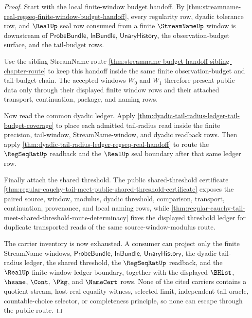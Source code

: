 \begin{proof}
Start with the local finite-window budget handoff. By
\autoref{thm:streamname-real-regseq-finite-window-budget-handoff}, every
regularity row, dyadic tolerance row, and $\RealUp$ seal row consumed from a
finite $\StreamNameUp$ window is downstream of $\mathsf{ProbeBundle}$,
$\mathsf{InBundle}$, $\mathsf{UnaryHistory}$, the observation-budget surface,
and the tail-budget rows.

Use the sibling StreamName route
\autoref{thm:streamname-budget-handoff-sibling-chapter-route} to keep this
handoff inside the same finite observation-budget and tail-budget chain. The
accepted windows $W_0$ and $W_1$ therefore present public data only through
their displayed finite window rows and their attached transport, continuation,
package, and naming rows.

Now read the common dyadic ledger. Apply
\autoref{thm:dyadic-tail-radius-ledger-tail-budget-coverage} to place each
admitted tail-radius read inside the finite precision, tail-window,
StreamName-window, and dyadic readback rows. Then apply
\autoref{thm:dyadic-tail-radius-ledger-regseq-real-handoff} to route the
$\RegSeqRatUp$ readback and the $\RealUp$ seal boundary after that same ledger
row.

Finally attach the shared threshold. The public shared-threshold certificate
\autoref{thm:regular-cauchy-tail-meet-public-shared-threshold-certificate}
exposes the paired source, window, modulus, dyadic threshold, comparison,
transport, continuation, provenance, and local naming rows, while
\autoref{thm:regular-cauchy-tail-meet-shared-threshold-route-determinacy}
fixes the displayed threshold ledger for duplicate transported reads of the
same source-window-modulus route.

The carrier inventory is now exhausted. A consumer can project only the finite
StreamName windows, $\mathsf{ProbeBundle}$, $\mathsf{InBundle}$,
$\mathsf{UnaryHistory}$, the dyadic tail-radius ledger, the shared threshold,
the $\RegSeqRatUp$ readback, and the $\RealUp$ finite-window ledger boundary,
together with the displayed $\BHist$, $\hsame$, $\Cont$, $\Pkg$, and
$\NameCert$ rows. None of the cited carriers contains a quotient stream, host
real equality witness, selected limit, independent tail oracle,
countable-choice selector, or completeness principle, so none can escape
through the public route.
\end{proof}

